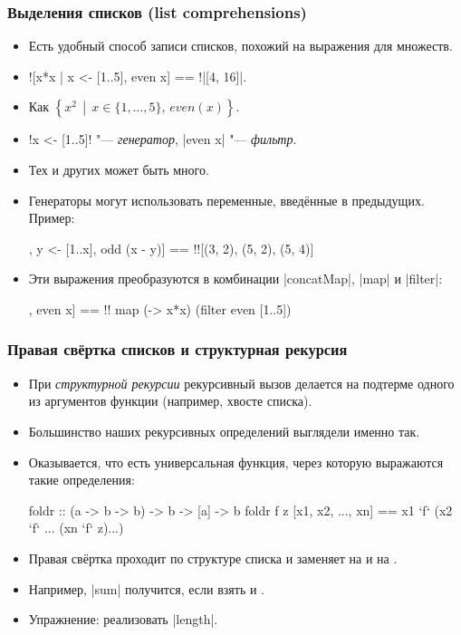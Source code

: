 \documentclass[11pt]{beamer}
\begin{document}
\begin{frame}[fragile]
  \frametitle{Выделения списков (list comprehensions)}
  \begin{itemize}
    \item Есть удобный способ записи списков, похожий на выражения для множеств.
    \item[] \haskinline![x*x | x <- [1..5], even x] == !\pause \haskinline|[4, 16]|.
    \item Как \(\left\{x^2\,\middle|\,x \in \{1, \ldots, 5\},\,even(x)\right\}\).
    \item \haskinline!x <- [1..5]! "--- \emph{генератор}, \haskinline|even x| "--- \emph{фильтр}.
          \pause
    \item Тех и других может быть много.
    \item Генераторы могут использовать переменные, введённые в предыдущих. Пример:
          \begin{haskell}
            [(x, y) | x <- [1..5], y <- [1..x], odd (x - y)] == !\pause![(3, 2), (5, 2), (5, 4)]
          \end{haskell}
    \item Эти выражения преобразуются в комбинации \haskinline|concatMap|, \haskinline|map| и \haskinline|filter|:
          \begin{haskell}
            [x*x | x <- [1..5], even x] == !\pause!
                map (\x -> x*x) (filter even [1..5])
          \end{haskell}
  \end{itemize}
\end{frame}

\begin{frame}[fragile]
  \frametitle{Правая свёртка списков и структурная рекурсия}
  \begin{itemize}
    \item При \emph{структурной рекурсии} рекурсивный вызов делается на подтерме одного из аргументов функции (например, хвосте списка).
    \item Большинство наших рекурсивных определений выглядели именно так.
    \pause
    \item Оказывается, что есть универсальная функция, через которую выражаются такие определения:
          \begin{haskell}
            foldr :: (a -> b -> b) -> b -> [a] -> b
            foldr f z [x1, x2, ..., xn] == 
              x1 `f` (x2 `f` ... (xn `f` z)...)
          \end{haskell}
    \item Правая свёртка проходит по структуре списка и заменяет \haskinline{[]} на  и \haskinline{(:)} на .
    \item Например, \haskinline|sum| получится, если взять  и .
    \item Упражнение: реализовать \haskinline|length|.
  \end{itemize}
\end{frame}
\end{document}
